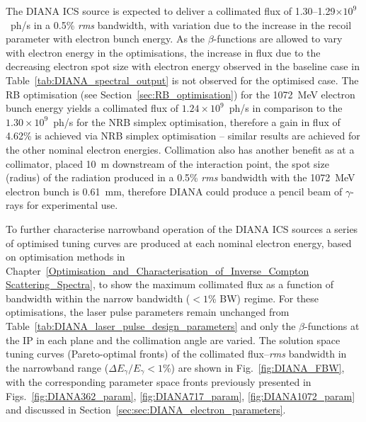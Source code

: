 \documentclass[../main.tex]{subfiles}
\begin{document}
The DIANA ICS source is expected to deliver a collimated flux of 1.30--1.29$\times 10^{9}$~ph/\si{\second} in a 0.5\% \textit{rms} bandwidth, with variation due to the increase in the recoil parameter with electron bunch energy. As the $\beta$-functions are allowed to vary with electron energy in the optimisations, the increase in flux due to the decreasing electron spot size with electron energy observed in the baseline case in Table~\ref{tab:DIANA_spectral_output} is not observed for the optimised case. The RB optimisation (see Section~\ref{sec:RB_optimisation}) for the 1072~\si{\mega\electronvolt} electron bunch energy yields a collimated flux of $1.24\times 10^{9}$~ph/\si{\second} in comparison to the $1.30\times 10^{9}$~ph/\si{\second} for the NRB simplex optimisation, therefore a gain in flux of 4.62\% is achieved via NRB simplex optimisation -- similar results are achieved for the other nominal electron energies.
Collimation also has another benefit as at a collimator, placed 10~\si{\meter} downstream of the interaction point, the spot size (radius) of the radiation produced in a 0.5\% \textit{rms} bandwidth with the 1072~\si{\mega\electronvolt} electron bunch is 0.61~\si{\milli\meter}, therefore DIANA could produce a pencil beam of $\gamma$-rays for experimental use.

To further characterise narrowband operation of the DIANA ICS sources a series of optimised tuning curves are produced at each nominal electron energy, based on optimisation methods in Chapter~\ref{Optimisation_and_Characterisation_of_Inverse_Compton Scattering_Spectra}, to show the maximum collimated flux as a function of bandwidth within the narrow bandwidth ($<1$\%  BW) regime. For these optimisations, the laser pulse parameters remain unchanged from Table~\ref{tab:DIANA_laser_pulse_design_parameters} and only the $\beta$-functions at the IP in each plane and the collimation angle are varied. The solution space tuning curves (Pareto-optimal fronts) of the collimated flux--\textit{rms} bandwidth in the narrowband range ($\Delta E_{\gamma}/E_{\gamma} < 1$\%) are shown in Fig.~\ref{fig:DIANA_FBW}, with the corresponding parameter space fronts previously presented in Figs.~\ref{fig:DIANA362_param}, \ref{fig:DIANA717_param}, \ref{fig:DIANA1072_param} and discussed in Section~\ref{sec:sec:DIANA_electron_parameters}.  
\end{document}

